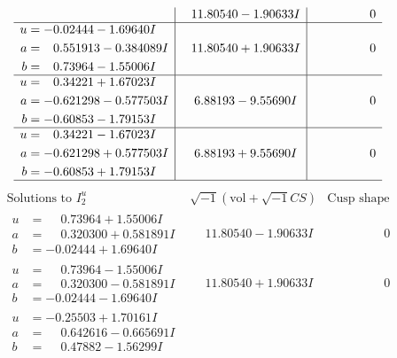\documentclass[1p]{elsarticle_modified}
\theoremstyle{definition}
\newcommand{\I}{\sqrt{-1}}
\begin{document}
$$\begin{array}{c|c|c}
 & \phantom{-}11.80540 - 1.90633 I & \phantom{-0.000000 } 0 \\ \hline\begin{aligned}
u &= -0.02444 - 1.69640 I \\
a &= \phantom{-}0.551913 - 0.384089 I \\
b &= \phantom{-}0.73964 - 1.55006 I\end{aligned}
 & \phantom{-}11.80540 + 1.90633 I & \phantom{-0.000000 } 0 \\ \hline\begin{aligned}
u &= \phantom{-}0.34221 + 1.67023 I \\
a &= -0.621298 - 0.577503 I \\
b &= -0.60853 - 1.79153 I\end{aligned}
 & \phantom{-}6.88193 - 9.55690 I & \phantom{-0.000000 } 0 \\ \hline\begin{aligned}
u &= \phantom{-}0.34221 - 1.67023 I \\
a &= -0.621298 + 0.577503 I \\
b &= -0.60853 + 1.79153 I\end{aligned}
 & \phantom{-}6.88193 + 9.55690 I & \phantom{-0.000000 } 0\\
 \hline 
 \end{array}$$\newpage$$\begin{array}{c|c|c}  
\text{Solutions to }I^u_{2}& \I (\text{vol} + \sqrt{-1}CS) & \text{Cusp shape}\\
 \hline 
\begin{aligned}
u &= \phantom{-}0.73964 + 1.55006 I \\
a &= \phantom{-}0.320300 + 0.581891 I \\
b &= -0.02444 + 1.69640 I\end{aligned}
 & \phantom{-}11.80540 - 1.90633 I & \phantom{-0.000000 } 0 \\ \hline\begin{aligned}
u &= \phantom{-}0.73964 - 1.55006 I \\
a &= \phantom{-}0.320300 - 0.581891 I \\
b &= -0.02444 - 1.69640 I\end{aligned}
 & \phantom{-}11.80540 + 1.90633 I & \phantom{-0.000000 } 0 \\ \hline\begin{aligned}
u &= -0.25503 + 1.70161 I \\
a &= \phantom{-}0.642616 - 0.665691 I \\
b &= \phantom{-}0.47882 - 1.56299 I\end{aligned}

\end{array}$$
\end{document}

